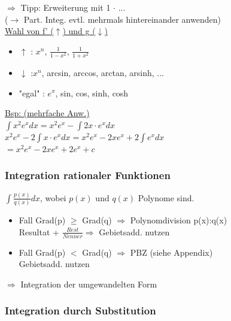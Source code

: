 \documentclass[6pt]{article}
\begin{document}
\begin{multicols*}{3}
		$\Rightarrow $ Tipp: Erweiterung mit 1 $\cdot$ ... \\
		($\rightarrow $ Part. Integ. evtl. mehrmals hintereinander anwenden) \\
		
		\underline{Wahl von f' ($\uparrow$) und g ($\downarrow$) } 
		\begin{itemize}
			\item $\uparrow$ : \quad $x^n$, $\frac{1}{1-x^2}$, $\frac{1}{1+x^2}$	
			\item $\downarrow$  :\quad $x^n$, arcsin, arccos, arctan, arsinh, ...
			\item "egal" : $e^x$, sin, cos, sinh, cosh
		\end{itemize}
		\vspace{2mm} 

		
		\underline{Bsp: (mehrfache Anw.)} \vspace{1mm} \\
		$\int x^2e^x dx = x^2e^x - \int 2x \cdot e^x  dx$ \quad  \\
		$x^2e^x - 2 \int x \cdot e^x dx = x^2e^x - 2xe^x + 2\int e^x dx$\\
		$=x^2e^x - 2xe^x + 2e^x + c $
	
			
	
	
	\subsubsection*{Integration rationaler Funktionen}
	$\int \frac{p(x)}{q(x)} dx$, wobei $p(x)$ und $q(x)$ Polynome sind.
	
	\begin{itemize} [itemsep=2pt, parsep=3pt ]
		\item Fall Grad(p) $\geq$ Grad(q) $\Rightarrow$ Polynomdivision p(x):q(x) \\
				 Resultat + $\frac{Rest}{Nenner} \Rightarrow$ Gebietsadd. nutzen
		\item Fall Grad(p) $<$ Grad(q)  $\Rightarrow$  PBZ  (siehe Appendix)	\\
				Gebietsadd. nutzen
	\end{itemize}

	$\Rightarrow $ Integration der umgewandelten Form
	
	


	
	\subsubsection*{Integration durch Substitution}


\end{multicols*}
\end{document}
